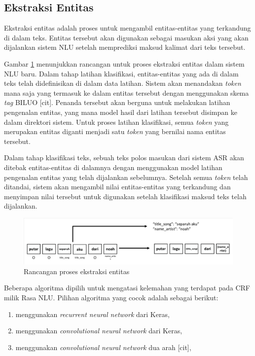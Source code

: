 \subsection{Ekstraksi Entitas}

Ekstraksi entitas adalah proses untuk mengambil entitas-entitas yang terkandung di dalam teks. Entitas tersebut akan digunakan sebagai masukan aksi yang akan dijalankan sistem NLU setelah memprediksi maksud kalimat dari teks tersebut.

Gambar \ref{fig:design_entity} menunjukkan rancangan untuk proses ekstraksi entitas dalam sistem NLU baru. Dalam tahap latihan klasifikasi, entitas-entitas yang ada di dalam teks telah didefinisikan di dalam data latihan. Sistem akan menandakan \textit{token} mana saja yang termasuk ke dalam entitas tersebut dengan menggunakan skema \textit{tag} BILUO [cit]. Penanda tersebut akan berguna untuk melakukan latihan pengenalan entitas, yang mana model hasil dari latihan tersebut disimpan ke dalam direktori sistem. Untuk proses latihan klasifikasi, semua \textit{token} yang merupakan entitas diganti menjadi satu \textit{token} yang bernilai nama entitas tersebut.

Dalam tahap klasifikasi teks, sebuah teks polos masukan dari sistem ASR akan ditebak entitas-entitas di dalamnya dengan menggunakan model latihan pengenalan entitas yang telah dijalankan sebelumnya. Setelah semua \textit{token} telah ditandai, sistem akan mengambil nilai entitas-entitas yang terkandung dan menyimpan nilai tersebut untuk digunakan setelah klasifikasi maksud teks telah dijalankan.

\begin{figure}[H]
	\centering
	\includegraphics[width=\textwidth, trim=2 2 2 2, clip]{resources/4-design_entity.pdf}
	\caption{Rancangan proses ekstraksi entitas}
	\label{fig:design_entity}
\end{figure}

Beberapa algoritma dipilih untuk mengatasi kelemahan yang terdapat pada CRF milik Rasa NLU. Pilihan algoritma yang cocok adalah sebagai berikut:

\begin{enumerate}
	\item menggunakan \textit{recurrent neural network} dari Keras,
	\item menggunakan \textit{convolutional neural network} dari Keras,
	\item menggunakan \textit{convolutional neural network} dua arah [cit],
\end{enumerate}

